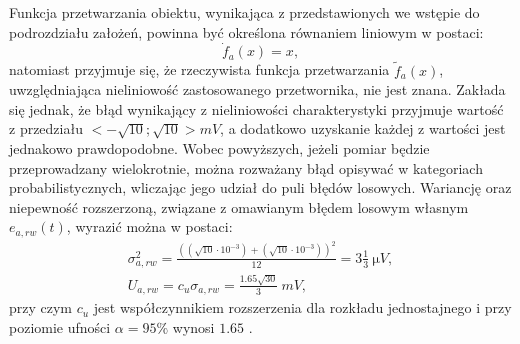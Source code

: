 Funkcja przetwarzania obiektu, wynikająca z przedstawionych we wstępie do podrozdziału założeń, powinna być określona równaniem liniowym w postaci:
\begin{equation}
\dot{f}_{a}(x) = x \label{eqn_sym_parta_statfun},
\end{equation}
natomiast przyjmuje się, że rzeczywista funkcja przetwarzania $\tilde{f}_{a}(x)$, uwzględniająca nieliniowość zastosowanego przetwornika, nie jest znana. Zakłada się jednak, że błąd wynikający z nieliniowości charakterystyki przyjmuje wartość z przedziału $<-\sqrt{10};\sqrt{10}>\unit{mV}$, a dodatkowo uzyskanie każdej z wartości jest jednakowo prawdopodobne. Wobec powyższych, jeżeli pomiar będzie przeprowadzany wielokrotnie, można rozważany błąd opisywać w kategoriach probabilistycznych, wliczając jego udział do puli błędów losowych. Wariancję oraz niepewność rozszerzoną, związane z omawianym błędem losowym własnym $e_{a,rw}(t)$, wyrazić można w postaci:
\begin{gather}
\sigma_{a,rw}^{2} = \frac{\left( \left( \sqrt{10} \cdot 10^{-3} \right) + \left( \sqrt{10} \cdot 10^{-3} \right) \right)^{2}}{12} = 3 \frac{1}{3} ~\unit{\micro V} \label{eqn_sym_parta_rand_self_var}, \\
U_{a,rw} = c_{u} \sigma_{a,rw} = \frac{1.65 \sqrt{30}}{3} ~\unit{mV} \label{eqn_sym_parta_rand_self_unc},
\end{gather}
przy czym $c_{u}$ jest współczynnikiem rozszerzenia dla rozkładu jednostajnego i przy poziomie ufności $\alpha = 95\%$ wynosi $1.65$ \cite{jcgm_guide}.


